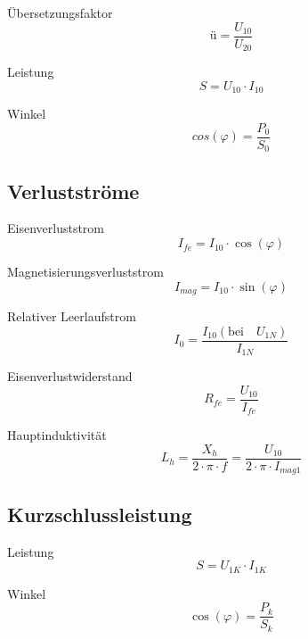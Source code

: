 \documentclass[11pt, a4paper, draft, fleqn, twocolumn]{article}
\numberwithin{equation}{subsection}
\begin{document}
Übersetzungsfaktor
\begin{equation}
    \text{ü} = \frac{U_{10}}{U_{20}}
\end{equation}

\noindent Leistung
\begin{equation}
    S = U_{10} \cdot I_{10}
\end{equation}

\noindent Winkel
\begin{equation}
    cos(\varphi) = \frac{P_{0}}{S_{0}}
\end{equation}


\subsection{Verlustströme}

Eisenverluststrom
\begin{equation}
    I_{fe} = I_{10} \cdot \cos(\varphi)
\end{equation}

\noindent Magnetisierungsverluststrom
\begin{equation}
    I_{mag} = I_{10} \cdot \sin(\varphi)
\end{equation}

\noindent Relativer Leerlaufstrom
\begin{equation}
    I_0 = \frac{I_{10} (\text{bei} \quad U_{1N})}{I_{1N}}
\end{equation}

\noindent Eisenverlustwiderstand
\begin{equation}
    R_{fe} = \frac{U_{10}}{I_{fe}}
\end{equation}

\noindent Hauptinduktivität
\begin{equation}
    L_h = \frac{X_h}{2 \cdot \pi \cdot f} = \frac{U_{10}}{2 \cdot \pi \cdot I_{mag1}}
\end{equation}


\subsection{Kurzschlussleistung}

Leistung
\begin{equation}
    S = U_{1K} \cdot I_{1K}
\end{equation}

\noindent Winkel
\begin{equation}
    \cos(\varphi) = \frac{P_k}{S_k}
\end{equation}
\end{document}
